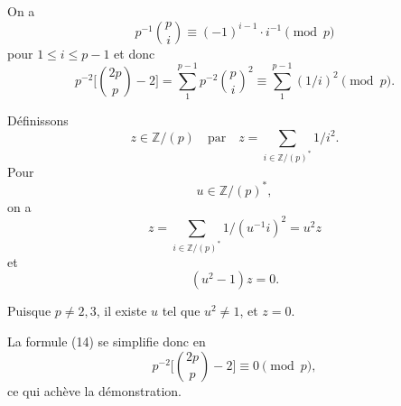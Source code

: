 \documentclass[12pt]{amsart}
\theoremstyle{plain}
\begin{document}
On a
\[
p^{-1} \binom{p}{i} \equiv (-1)^{i-1} \cdot i^{-1} \pmod{p}
\]
pour $1 \leqslant i \leqslant p-1$ et donc
\begin{equation}
p^{-2}\biggl[\binom{2p}{p} - 2\biggr] = \sum_1^{p-1} p^{-2} \binom{p}{i}^{\!2} \equiv \sum_1^{p-1} (1/i)^2 \pmod{p}.\tag{14}
\end{equation}

D\'efinissons
\[
z \in \mathbb{Z}/(p) \quad \text{par} \quad z = \sum_{i \in \mathbb{Z}/(p)^*} 1/i^2.
\]
Pour
\[
u \in \mathbb{Z}/(p)^*,
\]
on a
\[
z = \sum_{i \in \mathbb{Z}/(p)^*} 1/(u^{-1}i)^2 = u^2 z
\]
et
\[
(u^2 - 1)z = 0.
\]

Puisque $p \neq 2, 3$, il existe $u$ tel que $u^2 \neq 1$, et $z = 0$.

La formule (14) se simplifie donc en
\[
p^{-2}\biggl[\binom{2p}{p} - 2\biggr] \equiv 0 \pmod{p},
\]
ce qui ach\`eve la d\'emonstration.
\end{document}
